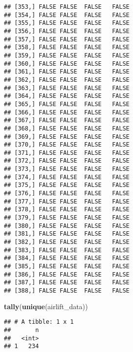 \documentclass[
]{article}
\newenvironment{Shaded}{\begin{snugshade}}{\end{snugshade}}
\newcommand{\FunctionTok}[1]{\textcolor[rgb]{0.13,0.29,0.53}{\textbf{#1}}}
\newcommand{\NormalTok}[1]{#1}
\newcommand{\OtherTok}[1]{\textcolor[rgb]{0.56,0.35,0.01}{#1}}
\newcommand{\SpecialCharTok}[1]{\textcolor[rgb]{0.81,0.36,0.00}{\textbf{#1}}}
\begin{document}
\begin{verbatim}
## [353,] FALSE FALSE  FALSE   FALSE
## [354,] FALSE FALSE  FALSE   FALSE
## [355,] FALSE FALSE  FALSE   FALSE
## [356,] FALSE FALSE  FALSE   FALSE
## [357,] FALSE FALSE  FALSE   FALSE
## [358,] FALSE FALSE  FALSE   FALSE
## [359,] FALSE FALSE  FALSE   FALSE
## [360,] FALSE FALSE  FALSE   FALSE
## [361,] FALSE FALSE  FALSE   FALSE
## [362,] FALSE FALSE  FALSE   FALSE
## [363,] FALSE FALSE  FALSE   FALSE
## [364,] FALSE FALSE  FALSE   FALSE
## [365,] FALSE FALSE  FALSE   FALSE
## [366,] FALSE FALSE  FALSE   FALSE
## [367,] FALSE FALSE  FALSE   FALSE
## [368,] FALSE FALSE  FALSE   FALSE
## [369,] FALSE FALSE  FALSE   FALSE
## [370,] FALSE FALSE  FALSE   FALSE
## [371,] FALSE FALSE  FALSE   FALSE
## [372,] FALSE FALSE  FALSE   FALSE
## [373,] FALSE FALSE  FALSE   FALSE
## [374,] FALSE FALSE  FALSE   FALSE
## [375,] FALSE FALSE  FALSE   FALSE
## [376,] FALSE FALSE  FALSE   FALSE
## [377,] FALSE FALSE  FALSE   FALSE
## [378,] FALSE FALSE  FALSE   FALSE
## [379,] FALSE FALSE  FALSE   FALSE
## [380,] FALSE FALSE  FALSE   FALSE
## [381,] FALSE FALSE  FALSE   FALSE
## [382,] FALSE FALSE  FALSE   FALSE
## [383,] FALSE FALSE  FALSE   FALSE
## [384,] FALSE FALSE  FALSE   FALSE
## [385,] FALSE FALSE  FALSE   FALSE
## [386,] FALSE FALSE  FALSE   FALSE
## [387,] FALSE FALSE  FALSE   FALSE
## [388,] FALSE FALSE  FALSE   FALSE
\end{verbatim}

\begin{Shaded}
\begin{Highlighting}[]
\FunctionTok{tally}\NormalTok{(}\FunctionTok{unique}\NormalTok{(airlift\_data))}
\end{Highlighting}
\end{Shaded}

\begin{verbatim}
## # A tibble: 1 x 1
##       n
##   <int>
## 1   234
\end{verbatim}

\begin{Shaded}
\end{Shaded}
\end{document}
